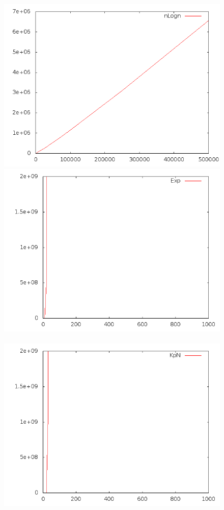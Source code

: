 \documentclass[a4paper,12pt]{report}
\begin{document}
\begin{figure}[!ht]
{		\includegraphics[scale=0.3]{q163.png}
     	\hspace*{1cm}
		\includegraphics[scale=0.3]{q164.png}
	}
	\hbox{ 
     	\hspace*{5cm}
		\includegraphics[scale=0.3]{q165.png}
	}
\end{figure}
\end{document}
